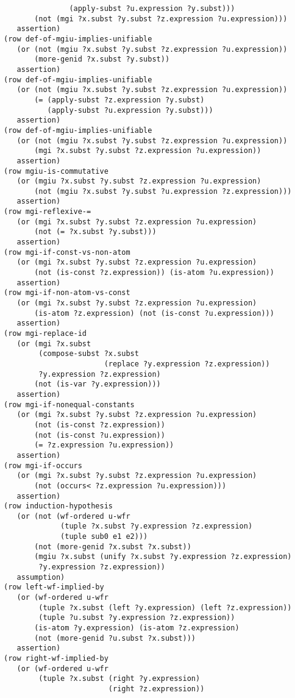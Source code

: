 \documentclass[runningheads]{llncs}
\begin{document}
\begin{verbatim}
               (apply-subst ?u.expression ?y.subst)))
       (not (mgi ?x.subst ?y.subst ?z.expression ?u.expression)))
   assertion)
(row def-of-mgiu-implies-unifiable
   (or (not (mgiu ?x.subst ?y.subst ?z.expression ?u.expression))
       (more-genid ?x.subst ?y.subst))
   assertion)
(row def-of-mgiu-implies-unifiable
   (or (not (mgiu ?x.subst ?y.subst ?z.expression ?u.expression))
       (= (apply-subst ?z.expression ?y.subst)
          (apply-subst ?u.expression ?y.subst)))
   assertion)
(row def-of-mgiu-implies-unifiable
   (or (not (mgiu ?x.subst ?y.subst ?z.expression ?u.expression))
       (mgi ?x.subst ?y.subst ?z.expression ?u.expression))
   assertion)
(row mgiu-is-commutative
   (or (mgiu ?x.subst ?y.subst ?z.expression ?u.expression)
       (not (mgiu ?x.subst ?y.subst ?u.expression ?z.expression)))
   assertion)
(row mgi-reflexive-=
   (or (mgi ?x.subst ?y.subst ?z.expression ?u.expression)
       (not (= ?x.subst ?y.subst)))
   assertion)
(row mgi-if-const-vs-non-atom
   (or (mgi ?x.subst ?y.subst ?z.expression ?u.expression)
       (not (is-const ?z.expression)) (is-atom ?u.expression))
   assertion)
(row mgi-if-non-atom-vs-const
   (or (mgi ?x.subst ?y.subst ?z.expression ?u.expression)
       (is-atom ?z.expression) (not (is-const ?u.expression)))
   assertion)
(row mgi-replace-id
   (or (mgi ?x.subst
        (compose-subst ?x.subst 
                       (replace ?y.expression ?z.expression))
        ?y.expression ?z.expression)
       (not (is-var ?y.expression)))
   assertion)
(row mgi-if-nonequal-constants
   (or (mgi ?x.subst ?y.subst ?z.expression ?u.expression)
       (not (is-const ?z.expression)) 
       (not (is-const ?u.expression))
       (= ?z.expression ?u.expression))
   assertion)
(row mgi-if-occurs
   (or (mgi ?x.subst ?y.subst ?z.expression ?u.expression)
       (not (occurs< ?z.expression ?u.expression)))
   assertion)
(row induction-hypothesis
   (or (not (wf-ordered u-wfr
             (tuple ?x.subst ?y.expression ?z.expression)
             (tuple sub0 e1 e2)))
       (not (more-genid ?x.subst ?x.subst))
       (mgiu ?x.subst (unify ?x.subst ?y.expression ?z.expression)
        ?y.expression ?z.expression))
   assumption)
(row left-wf-implied-by
   (or (wf-ordered u-wfr
        (tuple ?x.subst (left ?y.expression) (left ?z.expression))
        (tuple ?u.subst ?y.expression ?z.expression))
       (is-atom ?y.expression) (is-atom ?z.expression)
       (not (more-genid ?u.subst ?x.subst)))
   assertion)
(row right-wf-implied-by
   (or (wf-ordered u-wfr
        (tuple ?x.subst (right ?y.expression) 
                        (right ?z.expression))

\end{verbatim}
\end{document}
